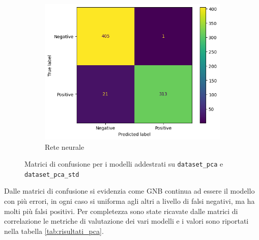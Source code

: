 \begin{figure}[!ht]
\begin{subfigure}{.45\textwidth}
    \end{subfigure}
    \hfill
    \begin{subfigure}{.45\textwidth}
        \centering
        \includegraphics[width=\textwidth]{img/rete/matrice_confusione_PCA.png}
        \caption{Rete neurale}
        \label{fig:matrice_di_confusione_per_NN_pca}
    \end{subfigure}
    \caption{Matrici di confusione per i modelli addestrati su \texttt{dataset\_pca} e \texttt{dataset\_pca\_std}}
    \label{fig:matrice_di_confusione_per_pca}
\end{figure}

Dalle matrici di confusione si evidenzia come GNB continua ad essere il modello 
con più errori, in ogni caso si uniforma agli altri a livello di falsi negativi,
ma ha molti più falsi positivi. Per completezza sono state ricavate dalle matrici 
di correlazione le metriche di valutazione dei vari modelli e i valori sono riportati 
nella tabella \ref{tab:risultati_pca}.

